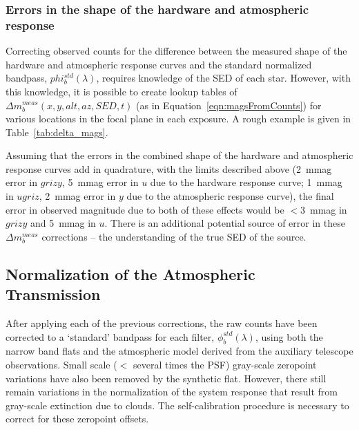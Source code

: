 \documentclass[12pt,preprint]{aastex}
\begin{document}
\subsubsection{Errors in the shape of the hardware and atmospheric response}
\label{sec:apply_deltak}

Correcting observed counts for the difference between the measured
shape of the hardware and atmospheric response curves and the standard
normalized bandpass, $phi_b^{std}(\lambda)$, requires knowledge of the
SED of each star. However, with this knowledge, it is possible to
create lookup tables of $\Delta m_b^{meas}(x,y,alt,az,SED,t)$ (as
in Equation~\ref{eqn:magsFromCounts}) for various locations in the focal
plane in each exposure. A rough example is given in
Table~\ref{tab:delta_mags}.

Assuming that the errors in the combined shape of the hardware and atmospheric
response curves add in quadrature, with the limits described above (2~mmag error
in $grizy$,  5~mmag error in $u$ due to the hardware response curve; 
1~mmag in $ugriz$, 2~mmag error in $y$ due to the atmospheric response curve), 
the final error in observed magnitude due to both of these effects would be $<3$~mmag
in $grizy$ and 5~mmag in $u$. There is an additional potential source of error in these
$\Delta m_b^{meas}$ corrections -- the understanding of the true SED of the 
source. 


\subsection{Normalization of the Atmospheric Transmission}
\label{sec:atmo_norm}

After applying each of the previous corrections, the raw counts have been
corrected to a `standard' bandpass for each filter,
$\phi_b^{std}(\lambda)$, using both the narrow band flats and the
atmospheric model derived from the auxiliary telescope
observations. Small scale ($<$ several times the PSF) gray-scale
zeropoint variations have also been removed by the synthetic
flat. However, there still remain variations in the normalization of the
system response that result from gray-scale extinction due to
clouds. The self-calibration procedure is necessary to correct for
these zeropoint offsets.
\end{document}
